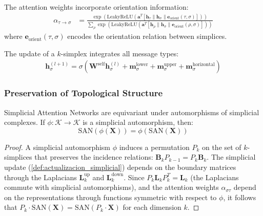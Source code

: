 \begin{definition}\label{def:pesos_atencion_simplicial}
The attention weights incorporate orientation information:
\begin{align}
    \alpha_{\tau \to \sigma} &= \frac{\exp(\text{LeakyReLU}(\mathbf{a}^T [\mathbf{h}_{\tau} \| \mathbf{h}_{\sigma} \| \mathbf{e}_{\text{orient}}(\tau,\sigma)]))}{\sum_{\rho} \exp(\text{LeakyReLU}(\mathbf{a}^T [\mathbf{h}_{\rho} \| \mathbf{h}_{\sigma} \| \mathbf{e}_{\text{orient}}(\rho,\sigma)]))}
\end{align}
where $\mathbf{e}_{\text{orient}}(\tau,\sigma)$ encodes the orientation relation between simplices.
\end{definition}

\begin{definition}\label{def:actualizacion_simplicial}
The update of a $k$-simplex integrates all message types:
\begin{align}
    \mathbf{h}_{\sigma}^{(l+1)} = \sigma\left(\mathbf{W}^{\text{self}} \mathbf{h}_{\sigma}^{(l)} + \mathbf{m}_{\sigma}^{\text{lower}} + \mathbf{m}_{\sigma}^{\text{upper}} + \mathbf{m}_{\sigma}^{\text{horizontal}}\right)
\end{align}
\end{definition}

\subsubsection{Preservation of Topological Structure}

\begin{theorem}\label{thm:equivarianza_simplicial}
Simplicial Attention Networks are equivariant under automorphisms of simplicial complexes. If $\phi: \mathcal{K} \to \mathcal{K}$ is a simplicial automorphism, then:
\begin{equation}
    \text{SAN}(\phi(\mathbf{X})) = \phi(\text{SAN}(\mathbf{X}))
\end{equation}
\end{theorem}

\begin{proof}
A simplicial automorphism $\phi$ induces a permutation $P_k$ on the set of $k$-simplices that preserves the incidence relations: $\mathbf{B}_k P_{k-1} = P_k \mathbf{B}_k$. The simplicial update (\autoref{def:actualizacion_simplicial}) depends on the boundary matrices through the Laplacians $\mathbf{L}_k^{\text{up}}$ and $\mathbf{L}_k^{\text{down}}$. Since $P_k \mathbf{L}_k P_k^T = \mathbf{L}_k$ (the Laplacians commute with simplicial automorphisms), and the attention weights $\alpha_{\sigma\tau}$ depend on the representations through functions symmetric with respect to $\phi$, it follows that $P_k \cdot \text{SAN}(\mathbf{X}) = \text{SAN}(P_k \cdot \mathbf{X})$ for each dimension $k$.
\end{proof}

